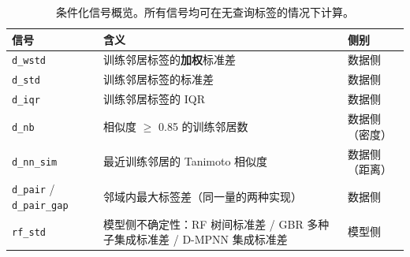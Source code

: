 \documentclass[UTF8, 11pt, a4paper]{ctexart}
\newcommand{\sig}[1]{\texttt{#1}}
\begin{document}
\listoftables
\clearpage

\begin{table}[htbp]
  \centering
  \caption{条件化信号概览。所有信号均可在无查询标签的情况下计算。}
  \label{tab:signals}
  \begin{tabularx}{\textwidth}{@{} l X l @{}}
    \toprule
    信号 & 含义 & 侧别 \\
    \midrule
    \sig{d\_wstd}            & 训练邻居标签的\textbf{加权}标准差 & 数据侧 \\
    \sig{d\_std}             & 训练邻居标签的标准差 & 数据侧 \\
    \sig{d\_iqr}             & 训练邻居标签的 IQR & 数据侧 \\
    \sig{d\_nb}              & 相似度 $\geq$ 0.85 的训练邻居数 & 数据侧（密度） \\
    \sig{d\_nn\_sim}         & 最近训练邻居的 Tanimoto 相似度 & 数据侧（距离） \\
    \sig{d\_pair} / \sig{d\_pair\_gap} & 邻域内最大标签差（同一量的两种实现） & 数据侧 \\
    \sig{rf\_std}            & 模型侧不确定性：RF 树间标准差 / GBR 多种子集成标准差 / D-MPNN 集成标准差 & 模型侧 \\
    \bottomrule
  \end{tabularx}
\end{table}
\end{document}
